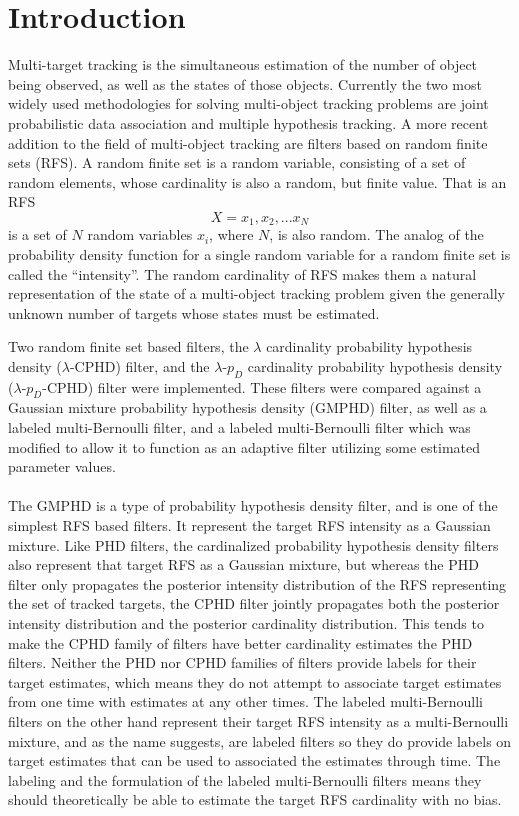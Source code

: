 \documentclass{article}
\newcommand{\lcphd}{$\lambda$-CPHD}
\newcommand{\lpdcphd}{$\lambda$-$p_D$-CPHD}
\begin{document}
\section{Introduction}

Multi-target tracking is the simultaneous estimation of the number of object being observed, as well as the states of those objects. Currently the two most widely used methodologies for solving multi-object tracking problems are joint probabilistic data association \cite{jpda} and multiple hypothesis tracking. A more recent addition to the field of multi-object tracking are filters based on random finite sets (RFS). A random finite set is a random variable, consisting of a set of random elements, whose cardinality is also a random, but finite value. That is an RFS
\begin{equation}
  X = {x_1, x_2, ... x_N}
\end{equation}
is a set of $N$ random variables $x_i$, where $N$, is also random. The analog of the probability density function for a single random variable for a random finite set is called the ``intensity''. The random cardinality of RFS makes them a natural representation of the state of a multi-object tracking problem given the generally unknown number of targets whose states must be estimated.

Two random finite set based filters, the $\lambda$ cardinality probability hypothesis density (\lcphd{}) filter\cite{cphd}, and the $\lambda$-$p_D$ cardinality probability hypothesis density (\lpdcphd{}) filter\cite{cphd} were implemented. These filters were compared against a Gaussian mixture probability hypothesis density (GMPHD)\cite{gmphd} filter, as well as a labeled multi-Bernoulli filter\cite{lmb}, and a labeled multi-Bernoulli filter which was modified to allow it to function as an adaptive filter utilizing some estimated parameter values.\\
\\
The GMPHD is a type of probability hypothesis density filter, and is one of the simplest RFS based filters. It represent the target RFS intensity as a Gaussian mixture. Like PHD filters, the cardinalized probability hypothesis density filters also represent that target RFS as a Gaussian mixture, but whereas the PHD filter only propagates the posterior intensity distribution of the RFS representing the set of tracked targets, the CPHD filter jointly propagates both the posterior intensity distribution and the posterior cardinality distribution. This tends to make the CPHD family of filters have better cardinality estimates the PHD filters. Neither the PHD nor CPHD families of filters provide labels for their target estimates, which means they do not attempt to associate target estimates from one time with estimates at any other times. The labeled multi-Bernoulli filters on the other hand represent their target RFS intensity as a multi-Bernoulli mixture, and as the name suggests, are labeled filters so they do provide labels on target estimates that can be used to associated the estimates through time. The labeling and the formulation of the labeled multi-Bernoulli filters means they should theoretically be able to estimate the target RFS cardinality with no bias.
\end{document}
